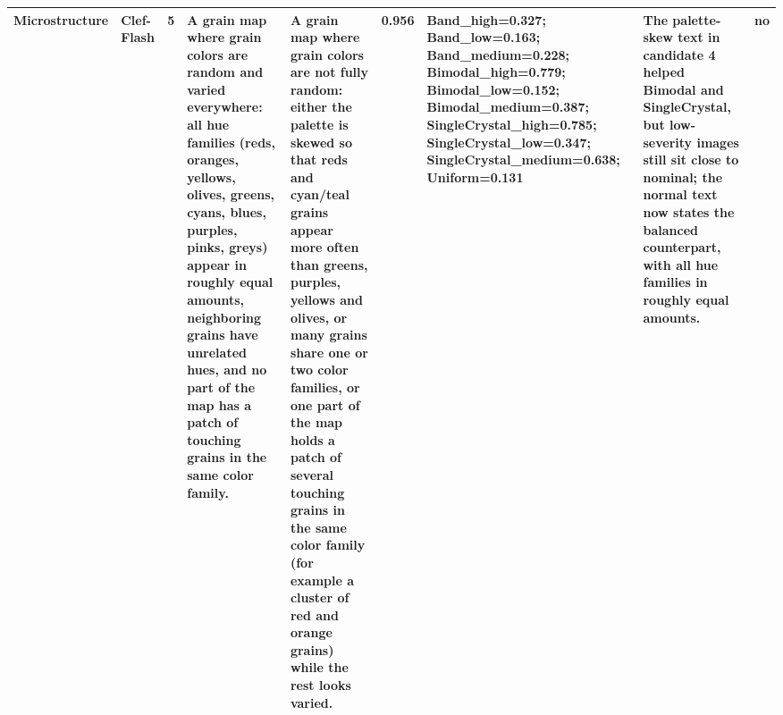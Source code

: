 \begin{table}
\begin{tabular}[t]{llrllrlll}
Microstructure & Clef-Flash & 5 & A grain map where grain colors are random and varied everywhere: all hue families (reds, oranges, yellows, olives, greens, cyans, blues, purples, pinks, greys) appear in roughly equal amounts, neighboring grains have unrelated hues, and no part of the map has a patch of touching grains in the same color family. & A grain map where grain colors are not fully random: either the palette is skewed so that reds and cyan/teal grains appear more often than greens, purples, yellows and olives, or many grains share one or two color families, or one part of the map holds a patch of several touching grains in the same color family (for example a cluster of red and orange grains) while the rest looks varied. & 0.956 & Band\_high=0.327; Band\_low=0.163; Band\_medium=0.228; Bimodal\_high=0.779; Bimodal\_low=0.152; Bimodal\_medium=0.387; SingleCrystal\_high=0.785; SingleCrystal\_low=0.347; SingleCrystal\_medium=0.638; Uniform=0.131 & The palette-skew text in candidate 4 helped Bimodal and SingleCrystal, but low-severity images still sit close to nominal; the normal text now states the balanced counterpart, with all hue families in roughly equal amounts. & no\\
\bottomrule
\end{tabular}
\end{table}
